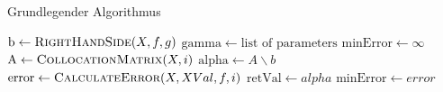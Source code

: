 \begin{algorithm}
\caption{Grundlegender Algorithmus}
\label{alg:Grund}
\begin{algorithmic}[1]

\State $\mathrm{b} \gets \Call{RightHandSide}{X,f,g}$
\State $\mathrm{gamma} \gets \text{list of parameters}$
\State $\mathrm{minError} \gets \infty$
	\State $\mathrm{A} \gets \Call{CollocationMatrix}{X, i}$
	\State $\mathrm{alpha} \gets A\backslash b$
	\State $\mathrm{error} \gets \Call{CalculateError}{X, XVal, f, i}$
		\State $\mathrm{retVal} \gets alpha$
		\State $\mathrm{minError} \gets error$
	\EndIf
\EndFor
\State {}
\EndFunction
\end{algorithmic}
\end{algorithm}